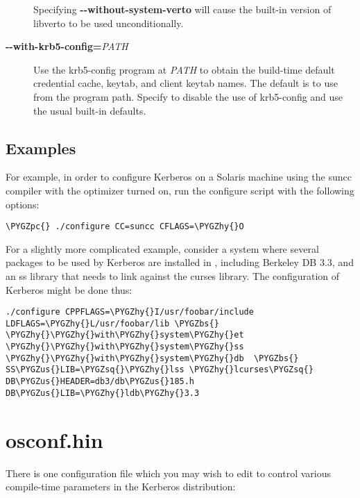 \documentclass[letterpaper,10pt,english]{sphinxmanual}
\def\PYGZbs{\char`\\}
\def\PYGZus{\char`\_}
\def\PYGZpc{\char`\%}
\def\PYGZhy{\char`\-}
\def\PYGZsq{\char`\'}
\begin{document}
\begin{description}
Specifying \textbf{-}\textbf{-without-system-verto} will cause the built-in
version of libverto to be used unconditionally.

\item[{\textbf{-}\textbf{-with-krb5-config=}\emph{PATH}}] \leavevmode
Use the krb5-config program at \emph{PATH} to obtain the build-time
default credential cache, keytab, and client keytab names.  The
default is to use  from the program path.  Specify
 to disable the use of krb5-config and
use the usual built-in defaults.

\end{description}


\subsection{Examples}
\label{build/options2configure:examples}
For example, in order to configure Kerberos on a Solaris machine using
the suncc compiler with the optimizer turned on, run the configure
script with the following options:

\begin{Verbatim}[commandchars=\\\{\}]
\PYGZpc{} ./configure CC=suncc CFLAGS=\PYGZhy{}O
\end{Verbatim}

For a slightly more complicated example, consider a system where
several packages to be used by Kerberos are installed in
, including Berkeley DB 3.3, and an ss library that
needs to link against the curses library.  The configuration of
Kerberos might be done thus:

\begin{Verbatim}[commandchars=\\\{\}]
./configure CPPFLAGS=\PYGZhy{}I/usr/foobar/include LDFLAGS=\PYGZhy{}L/usr/foobar/lib \PYGZbs{}
\PYGZhy{}\PYGZhy{}with\PYGZhy{}system\PYGZhy{}et \PYGZhy{}\PYGZhy{}with\PYGZhy{}system\PYGZhy{}ss \PYGZhy{}\PYGZhy{}with\PYGZhy{}system\PYGZhy{}db  \PYGZbs{}
SS\PYGZus{}LIB=\PYGZsq{}\PYGZhy{}lss \PYGZhy{}lcurses\PYGZsq{}  DB\PYGZus{}HEADER=db3/db\PYGZus{}185.h DB\PYGZus{}LIB=\PYGZhy{}ldb\PYGZhy{}3.3
\end{Verbatim}


\section{osconf.hin}
\label{build/osconf:osconf-hin}\label{build/osconf::doc}
There is one configuration file which you may wish to edit to control
various compile-time parameters in the Kerberos distribution:
\end{document}

